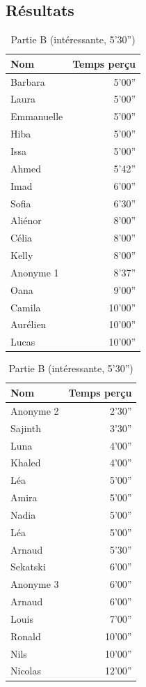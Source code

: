 \documentclass[12pt,fleqn,oneside,openany]{book} %
\begin{document}

\subsection{Résultats} \label{ssec:resultats1}

\begin{table}[h!]
\centering
\begin{minipage}[t]{.49\textwidth}
    \caption{Partie A (ennuyeuse, 5'20'')} \label{tbl:exp1.1A}
	\begin{tabular}{lr}
		\toprule 
		\textbf{Nom} & \textbf{Temps perçu}\\ \midrule
		Barbara & 5'00'' \\
		Laura & 5'00'' \\
		Emmanuelle & 5'00'' \\
		Hiba & 5'00'' \\
		Issa & 5'00'' \\
		Ahmed & 5'42'' \\
		Imad & 6'00'' \\
		Sofia & 6'30'' \\
		Aliénor & 8'00'' \\
		Célia & 8'00'' \\
		Kelly & 8'00'' \\
		Anonyme 1 & 8'37'' \\
		Oana & 9'00'' \\
		Camila & 10'00'' \\
		Aurélien & 10'00'' \\
		Lucas & 10'00'' \\ \bottomrule
	\end{tabular}
\end{minipage}
\hfill
\begin{minipage}[t]{.49\textwidth}
	\caption{Partie B (intéressante, 5'30'')} \label{tbl:exp1.1B}
    \begin{tabular}{lr}
		\toprule
		\textbf{Nom} & \textbf{Temps perçu} \\ \midrule
		Anonyme 2 & 2'30'' \\
		Sajinth & 3'30'' \\
		Luna & 4'00'' \\
		Khaled & 4'00'' \\
		Léa & 5'00'' \\
		Amira & 5'00'' \\
		Nadia & 5'00'' \\
		Léa & 5'00'' \\
		Arnaud & 5'30'' \\
		Sekatski & 6'00'' \\
		Anonyme 3 & 6'00'' \\
		Arnaud & 6'00'' \\
		Louis & 7'00'' \\
		Ronald & 10'00'' \\
		Nils & 10'00'' \\
		Nicolas & 12'00'' \\ \bottomrule
	\end{tabular}
\end{minipage}
\end{table}
\end{document}
